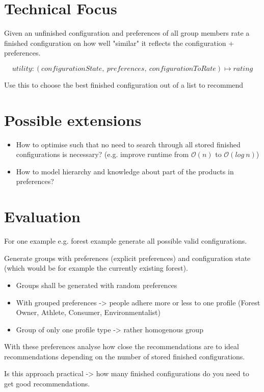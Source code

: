 \documentclass{article}
\begin{document}
\FloatBarrier

\section{Technical Focus}

Given an unfinished configuration and preferences of all group members rate a finished configuration on how well "similar" it reflects the configuration + preferences.

$$utility : (configurationState,\ preferences,\ configurationToRate) \mapsto rating$$

Use this to choose the best finished configuration out of a list to recommend

\section{Possible extensions}

\begin{itemize}
    \item How to optimise such that no need to search through all stored finished configurations is necessary? (e.g. improve runtime from $\mathcal{O}(n)$ to $\mathcal{O}(log\ n)$)
    \item How to model hierarchy and knowledge about part of the products in preferences?
\end{itemize}
    
    
\section{Evaluation}

For one example e.g. forest example generate all possible valid configurations.

Generate groups with preferences (explicit preferences) and configuration state (which would be for example the currently existing forest).

\begin{itemize}
    \item Groups shall be generated with random preferences
    \item With grouped preferences -> people adhere more or less to one profile (Forest Owner, Athlete, Consumer, Environmentalist)
    \item Group of only one profile type -> rather homogenous group
\end{itemize}

With these preferences analyse how close the recommendations are to ideal recommendations depending on the number of stored finished configurations.

Is this approach practical -> how many finished configurations do you need to get good recommendations.
\end{document}

